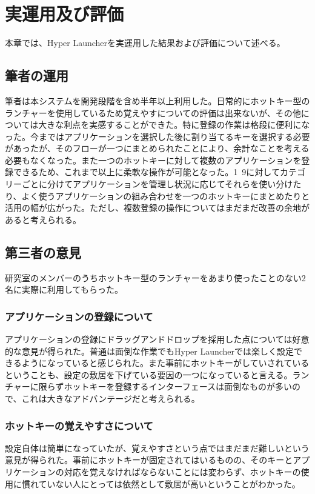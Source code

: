 \chapter{実運用及び評価}
本章では、Hyper Launcherを実運用した結果および評価について述べる。

\newpage

\section{筆者の運用}
筆者は本システムを開発段階を含め半年以上利用した。日常的にホットキー型のランチャーを使用しているため覚えやすについての評価は出来ないが、その他については大きな利点を実感することができた。特に登録の作業は格段に便利になった。今まではアプリケーションを選択した後に割り当てるキーを選択する必要があったが、そのフローが一つにまとめられたことにより、余計なことを考える必要もなくなった。また一つのホットキーに対して複数のアプリケーションを登録できるため、これまで以上に柔軟な操作が可能となった。1~9に対してカテゴリーごとに分けてアプリケーションを管理し状況に応じてそれらを使い分けたり、よく使うアプリケーションの組み合わせを一つのホットキーにまとめたりと活用の幅が広がった。ただし、複数登録の操作についてはまだまだ改善の余地があると考えられる。

\section{第三者の意見}
研究室のメンバーのうちホットキー型のランチャーをあまり使ったことのない2名に実際に利用してもらった。

\subsection{アプリケーションの登録について}
アプリケーションの登録にドラッグアンドドロップを採用した点については好意的な意見が得られた。普通は面倒な作業でもHyper Launcherでは楽しく設定できるようになっていると感じられた。また事前にホットキーがしていされているということも、設定の敷居を下げている要因の一つになっていると言える。ランチャーに限らずホットキーを登録するインターフェースは面倒なものが多いので、これは大きなアドバンテージだと考えられる。

\subsection{ホットキーの覚えやすさについて}
設定自体は簡単になっていたが、覚えやすさという点ではまだまだ難しいという意見が得られた。事前にホットキーが固定されてはいるものの、そのキーとアプリケーションの対応を覚えなければならないことには変わらず、ホットキーの使用に慣れていない人にとっては依然として敷居が高いということがわかった。

